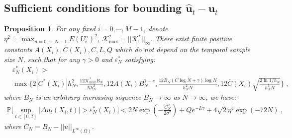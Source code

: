 \documentclass[a4paper,11pt]{article}
\newcommand{\bu}{\mathbf{u}}
\newtheorem{prop}{Proposition}[section]
\begin{document}
\subsection{Sufficient conditions for bounding $\widehat{\bu}_t-\bu_t$}
\begin{prop}\label{prop.Deltat}
For any fixed $i=0,\cdots,M-1$, denote $\eta^2 = \max_{n=0,\cdots,N-1}E(U_i^n)^2$, $\mathcal{K}^*_{\max}=||\mathcal{K}^*||_\infty$. There exist finite positive constants $A(X_i),\overline{C}(X_i),C,L,Q$ which do not depend on the temporal sample size $N$, such that for any $\gamma>0$ and $\varepsilon_N^*$ satisfying:
\begin{align*}
&\varepsilon_N^*(X_i)>\\
&\max\{2|C^*(X_i)|h_N^2,\frac{12\mathcal{K}^*_{\max}B_N}{Nh_N^2},12A(X_i)B_N^{1-s},\frac{12B_N(C\log N+\gamma)\log N}{h_N^2N},12\overline{C}(X_i)\sqrt{\frac{2\ln1/h_N}{h_N^3N}}\}\;,	
\end{align*}
where $B_N$ is an arbitrary increasing sequence $B_N\to\infty$ as $N\to\infty$, we have:
\begin{align}
\mathbb{P}\Big[\sup_{t\in[0,T]}|\Delta u_t(X_i,t)|>\varepsilon_N^*(X_i)\Big]<2N \exp(-\frac{C_N^2}{2\sigma^2})+Qe^{-L\gamma}+4\sqrt{2}\eta^4\exp(-72N)\;,\label{eq.boundDut}
\end{align}
where $C_N =B_N-||u||_{L^\infty(\Omega)}$.
\end{prop}
\end{document}
